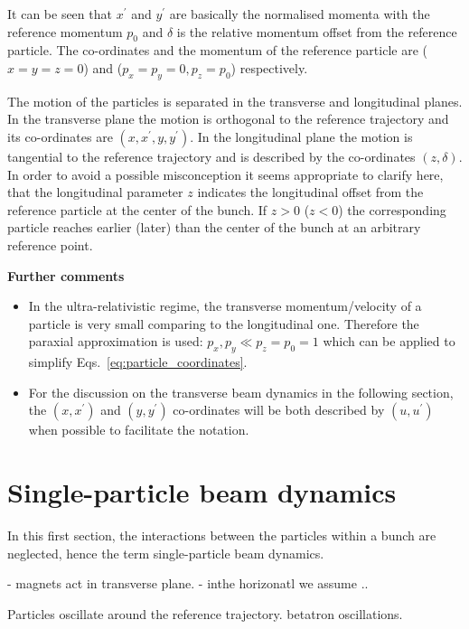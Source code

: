 It can be seen that $x^\prime$ and $y^\prime$ are basically the normalised momenta with the reference momentum $p_0$ and $\delta$ is the relative momentum offset from the reference particle. The co-ordinates and the momentum of the reference particle are ($x=y=z=0$) and ($p_x=p_y=0, p_z=p_0$) respectively.

The motion of the particles is separated in the transverse and longitudinal planes. In the transverse plane the motion is orthogonal to the reference trajectory and its co-ordinates are $(x, x^\prime, y, y^\prime)$. In the longitudinal plane the motion is tangential to the reference trajectory and is described by the co-ordinates $(z, \delta)$. In order to avoid a possible misconception it seems appropriate to clarify here, that the longitudinal parameter $z$ indicates the longitudinal offset from the reference particle at the center of the bunch. If $z>0$ ($z < 0$) the corresponding particle reaches earlier (later) than the center of the bunch at an arbitrary reference point.

\textbf{Further comments}
\begin{itemize}[noitemsep, topsep=-8pt]  %
    \item In the ultra-relativistic regime, the transverse momentum/velocity of a particle is very small comparing to the longitudinal one. Therefore the paraxial approximation is used: $p_x, p_y \ll p_z = p_0 = 1$ which can be applied to simplify Eqs.~\ref{eq:particle_coordinates}. %
    \item For the discussion on the transverse beam dynamics in the following section, the $(x, x^\prime)$ and $(y, y^\prime)$ co-ordinates will be both described by $(u, u^\prime)$ when possible to facilitate the notation.
\end{itemize}

\section{Single-particle beam dynamics}
In this first section, the interactions between the particles within a bunch are neglected, hence the term single-particle beam dynamics.

- magnets act in transverse plane.
- inthe horizonatl we assume ..


Particles oscillate around the reference trajectory. betatron oscillations.

